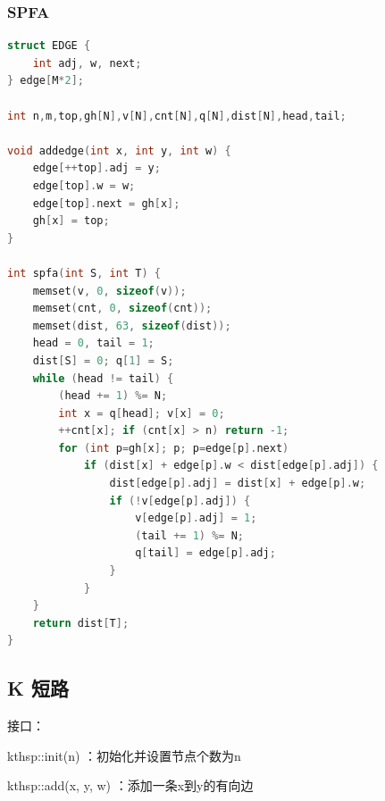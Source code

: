 \documentclass{article}
\begin{document}
\subsubsection{SPFA}
\begin{lstlisting}[language=C++]
struct EDGE {
	int adj, w, next;
} edge[M*2];

int n,m,top,gh[N],v[N],cnt[N],q[N],dist[N],head,tail;

void addedge(int x, int y, int w) {
	edge[++top].adj = y;
	edge[top].w = w;
	edge[top].next = gh[x];
	gh[x] = top;
}

int spfa(int S, int T) {
	memset(v, 0, sizeof(v));
	memset(cnt, 0, sizeof(cnt));
	memset(dist, 63, sizeof(dist));
	head = 0, tail = 1;
	dist[S] = 0; q[1] = S;
	while (head != tail) {
		(head += 1) %= N;
		int x = q[head]; v[x] = 0;
		++cnt[x]; if (cnt[x] > n) return -1;
		for (int p=gh[x]; p; p=edge[p].next)
			if (dist[x] + edge[p].w < dist[edge[p].adj]) {
				dist[edge[p].adj] = dist[x] + edge[p].w;
				if (!v[edge[p].adj]) {
					v[edge[p].adj] = 1;
					(tail += 1) %= N;
					q[tail] = edge[p].adj;
				}
			}
	}
	return dist[T];
}
\end{lstlisting}
\subsection{K 短路}
接口：

kthsp::init(n) ：初始化并设置节点个数为n

kthsp::add(x, y, w) ：添加一条x到y的有向边
\end{document}
